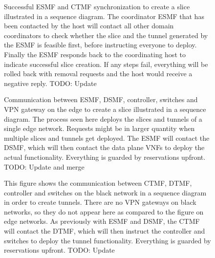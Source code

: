 \begin{figure}[hp]
  \centering
  
  \caption[Successful ESMF and CTMF synchronization to create a slice illustrated in a sequence diagram.]{Successful ESMF and CTMF synchronization to create a slice illustrated in a sequence diagram. The coordinator ESMF that has been contacted by the host will contact all other domain coordinators to check whether the slice and the tunnel generated by the ESMF is feasible first, before instructing everyone to deploy. Finally the ESMF responds back to the coordinating host to indicate successful slice creation. If any steps fail, everything will be rolled back with removal requests and the host would receive a negative reply. TODO: Update}
  \label{fig:slice_creation_synchronization}
\end{figure}
\begin{figure}[hp]
  \centering
  
  \caption[Communication between ESMF, DSMF, controller, switches and VPN gateway on the edge to create a slice illustrated in a sequence diagram.]{Communication between ESMF, DSMF, controller, switches and VPN gateway on the edge to create a slice illustrated in a sequence diagram. The process seen here deploys the slices and tunnels of a single edge network. Requests might be in larger quantity when multiple slices and tunnels get deployed. The ESMF will contact the DSMF, which will then contact the data plane VNFs to deploy the actual functionality. Everything is guarded by reservations upfront. TODO: Update and merge}
  \label{fig:slice_creation_edge}
\end{figure}
\begin{figure}[hp]
  \centering
  
  \caption[This figure shows the communication between CTMF, DTMF, controller and switches on the black network in a sequence diagram in order to create tunnels.]{This figure shows the communication between CTMF, DTMF, controller and switches on the black network in a sequence diagram in order to create tunnels. There are no VPN gateways on black networks, so they do not appear here as compared to the figure on edge networks. As previously with ESMF and DSMF, the CTMF will contact the DTMF, which will then instruct the controller and switches to deploy the tunnel functionality. Everything is guarded by reservations upfront. TODO: Update}
  \label{fig:slice_creation_bn}
\end{figure}

